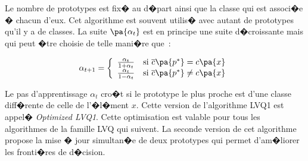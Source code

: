 Le nombre de prototypes est fix� au d�part ainsi que la classe qui est associ�e � chacun d'eux. Cet algorithme est souvent utilis� avec autant de prototypes qu'il y a de classes. La suite $\pa{\alpha_t}$ est en principe une suite d�croissante mais qui peut �tre choisie de telle mani�re que~:

        \begin{eqnarray}
        \alpha_{t+1} = \left\{ \begin{array}{ll}
                                                \frac{\alpha_t}{1 + \alpha_t} & \text{si } \overline{c}\pa{p^*} = c\pa{x}\\
                                                \frac{\alpha_t}{1 - \alpha_t} & \text{si } \overline{c}\pa{p^*} \neq c\pa{x}
                                                \end{array} \right.
        \end{eqnarray}
        
        
Le pas d'apprentissage $\alpha_t$ cro�t si le prototype le plus proche est d'une classe diff�rente de celle de l'�l�ment $x$. Cette version de l'algorithme LVQ1 est appel� \emph{Optimized LVQ1}. Cette optimisation est valable pour tous les algorithmes de la famille LVQ qui suivent. La seconde version de cet algorithme propose la mise � jour simultan�e de deux prototypes qui permet d'am�liorer les fronti�res de d�cision. 



